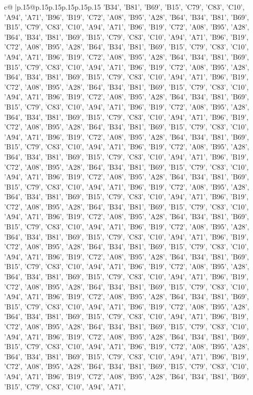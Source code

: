 \documentclass{article}
\begin{document}
{\begin{supertabular}{c@{$\;$}|p{.15\linewidth}@{}p{.15\linewidth}p{.15\linewidth}p{.15\linewidth}p{.15\linewidth}p{.15\linewidth}}
{{{'B34', 'B81', 'B69', 'B15', 'C79', 'C83', 'C10', 'A94', 'A71', 'B96', 'B19', 'C72', 'A08', 'B95', 'A28', 'B64', 'B34', 'B81', 'B69', 'B15', 'C79', 'C83', 'C10', 'A94', 'A71', 'B96', 'B19', 'C72', 'A08', 'B95', 'A28', 'B64', 'B34', 'B81', 'B69', 'B15', 'C79', 'C83', 'C10', 'A94', 'A71', 'B96', 'B19', 'C72', 'A08', 'B95', 'A28', 'B64', 'B34', 'B81', 'B69', 'B15', 'C79', 'C83', 'C10', 'A94', 'A71', 'B96', 'B19', 'C72', 'A08', 'B95', 'A28', 'B64', 'B34', 'B81', 'B69', 'B15', 'C79', 'C83', 'C10', 'A94', 'A71', 'B96', 'B19', 'C72', 'A08', 'B95', 'A28', 'B64', 'B34', 'B81', 'B69', 'B15', 'C79', 'C83', 'C10', 'A94', 'A71', 'B96', 'B19', 'C72', 'A08', 'B95', 'A28', 'B64', 'B34', 'B81', 'B69', 'B15', 'C79', 'C83', 'C10', 'A94', 'A71', 'B96', 'B19', 'C72', 'A08', 'B95', 'A28', 'B64', 'B34', 'B81', 'B69', 'B15', 'C79', 'C83', 'C10', 'A94', 'A71', 'B96', 'B19', 'C72', 'A08', 'B95', 'A28', 'B64', 'B34', 'B81', 'B69', 'B15', 'C79', 'C83', 'C10', 'A94', 'A71', 'B96', 'B19', 'C72', 'A08', 'B95', 'A28', 'B64', 'B34', 'B81', 'B69', 'B15', 'C79', 'C83', 'C10', 'A94', 'A71', 'B96', 'B19', 'C72', 'A08', 'B95', 'A28', 'B64', 'B34', 'B81', 'B69', 'B15', 'C79', 'C83', 'C10', 'A94', 'A71', 'B96', 'B19', 'C72', 'A08', 'B95', 'A28', 'B64', 'B34', 'B81', 'B69', 'B15', 'C79', 'C83', 'C10', 'A94', 'A71', 'B96', 'B19', 'C72', 'A08', 'B95', 'A28', 'B64', 'B34', 'B81', 'B69', 'B15', 'C79', 'C83', 'C10', 'A94', 'A71', 'B96', 'B19', 'C72', 'A08', 'B95', 'A28', 'B64', 'B34', 'B81', 'B69', 'B15', 'C79', 'C83', 'C10', 'A94', 'A71', 'B96', 'B19', 'C72', 'A08', 'B95', 'A28', 'B64', 'B34', 'B81', 'B69', 'B15', 'C79', 'C83', 'C10', 'A94', 'A71', 'B96', 'B19', 'C72', 'A08', 'B95', 'A28', 'B64', 'B34', 'B81', 'B69', 'B15', 'C79', 'C83', 'C10', 'A94', 'A71', 'B96', 'B19', 'C72', 'A08', 'B95', 'A28', 'B64', 'B34', 'B81', 'B69', 'B15', 'C79', 'C83', 'C10', 'A94', 'A71', 'B96', 'B19', 'C72', 'A08', 'B95', 'A28', 'B64', 'B34', 'B81', 'B69', 'B15', 'C79', 'C83', 'C10', 'A94', 'A71', 'B96', 'B19', 'C72', 'A08', 'B95', 'A28', 'B64', 'B34', 'B81', 'B69', 'B15', 'C79', 'C83', 'C10', 'A94', 'A71', 'B96', 'B19', 'C72', 'A08', 'B95', 'A28', 'B64', 'B34', 'B81', 'B69', 'B15', 'C79', 'C83', 'C10', 'A94', 'A71', 'B96', 'B19', 'C72', 'A08', 'B95', 'A28', 'B64', 'B34', 'B81', 'B69', 'B15', 'C79', 'C83', 'C10', 'A94', 'A71', 'B96', 'B19', 'C72', 'A08', 'B95', 'A28', 'B64', 'B34', 'B81', 'B69', 'B15', 'C79', 'C83', 'C10', 'A94', 'A71', 'B96', 'B19', 'C72', 'A08', 'B95', 'A28', 'B64', 'B34', 'B81', 'B69', 'B15', 'C79', 'C83', 'C10', 'A94', 'A71', 'B96', 'B19', 'C72', 'A08', 'B95', 'A28', 'B64', 'B34', 'B81', 'B69', 'B15', 'C79', 'C83', 'C10', 'A94', 'A71', 'B96', 'B19', 'C72', 'A08', 'B95', 'A28', 'B64', 'B34', 'B81', 'B69', 'B15', 'C79', 'C83', 'C10', 'A94', 'A71', 'B96', 'B19', 'C72', 'A08', 'B95', 'A28', 'B64', 'B34', 'B81', 'B69', 'B15', 'C79', 'C83', 'C10', 'A94', 'A71', 'B96', 'B19', 'C72', 'A08', 'B95', 'A28', 'B64', 'B34', 'B81', 'B69', 'B15', 'C79', 'C83', 'C10', 'A94', 'A71', 'B96', 'B19', 'C72', 'A08', 'B95', 'A28', 'B64', 'B34', 'B81', 'B69', 'B15', 'C79', 'C83', 'C10', 'A94', 'A71', 'B96', 'B19', 'C72', 'A08', 'B95', 'A28', 'B64', 'B34', 'B81', 'B69', 'B15', 'C79', 'C83', 'C10', 'A94', 'A71', }}}
\end{supertabular}}
\end{document}
